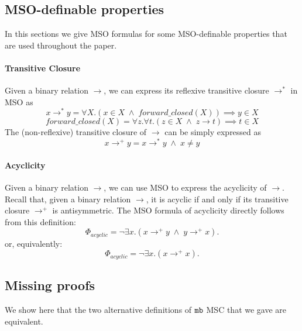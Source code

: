 \subsection{MSO-definable properties}

In this sections we give MSO formulas for some MSO-definable properties that are used throughout the paper.

\paragraph*{Transitive Closure}
Given a binary relation $\to$, we can express its reflexive transitive closure $\to^*$ in MSO as
\[
x \to^* y = \forall X.(x \in X \;\wedge\; forward\_closed(X)) \implies y \in X
\]
\[
forward\_closed(X) = \forall z.\forall t.(z \in X \;\wedge\; z \to t) \implies t \in X
\]
The (non-reflexive) transitive closure of $\to$ can be simply expressed as
\[
x \to^+ y = x \to^* y \;\wedge\; x \neq y
\]

\paragraph*{Acyclicity} 

Given a binary relation $\to$, we can use MSO to express the acyclicity of $\to$. Recall that, given a binary relation $\to$, it is acyclic if and only if its transitive closure $\to^+$ is antisymmetric. The MSO formula of acyclicity directly follows from this definition:
\[
\Phi_{acyclic} =  \neg \exists x.(x \to^+ y \;\wedge\; y \to^+ x).   
\]
or, equivalently:
\[
\Phi_{acyclic} =  \neg \exists x.(x \to^+ x).   
\]

\subsection{Missing proofs}

We show here that the two alternative definitions of $\mathtt{mb}$ MSC that we gave are equivalent.

